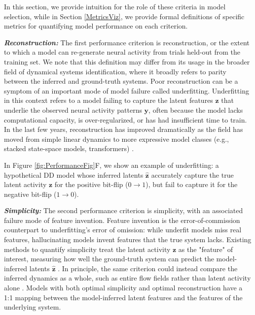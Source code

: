 \documentclass{article}
\begin{document}
In this section, we provide intuition for the role of these criteria in model selection, while in Section \ref{MetricsViz}, we provide formal definitions of specific metrics for quantifying model performance on each criterion.

\textbf{\textit{Reconstruction:}}
The first performance criterion is reconstruction, or the extent to which a model can re-generate neural activity from trials held-out from the training set. We note that this definition may differ from its usage in the broader field of dynamical systems identification, where it broadly refers to parity between the inferred and ground-truth systems. Poor reconstruction can be a symptom of an important mode of model failure called underfitting. Underfitting in this context refers to a model failing to capture the latent features $\textbf{z}$ that underlie the observed neural activity patterns $\textbf{y}$, often because the model lacks computational capacity, is over-regularized, or has had insufficient time to train. In the last few years, reconstruction has improved dramatically as the field has moved from simple linear dynamics to more expressive model classes (e.g., stacked state-space models, transformers) \cite{linderman2017bayesian, smith2023simplifiedstatespacelayers, ye2021ndt, pei_neural_2022}.

In Figure \ref{fig:PerformanceFig}F, we show an example of underfitting: a hypothetical DD model whose inferred latents $\mathbf{\hat{z}}$ accurately capture the true latent activity $\textbf{z}$ for the positive bit-flip ($0\rightarrow1$), but fail to capture it for the negative bit-flip ($1\rightarrow0$).

\textbf{\textit{Simplicity:}}
The second performance criterion is simplicity, with an associated failure mode of feature invention. Feature invention is the error-of-commission counterpart to underfitting’s error of omission: while underfit models miss real features, hallucinating models invent features that the true system lacks. Existing methods to quantify simplicity treat the latent activity $\textbf{z}$ as the "feature" of interest, measuring how well the ground-truth system can predict the model-inferred latents $\mathbf{\hat{z}}$ \cite{sedler_expressive_2022}. In principle, the same criterion could instead compare the inferred dynamics as a whole, such as entire flow fields rather than latent activity alone \cite{Genkin2020-ow}. Models with both optimal simplicity and optimal reconstruction have a 1:1 mapping between the model-inferred latent features and the features of the underlying system.
\end{document}
